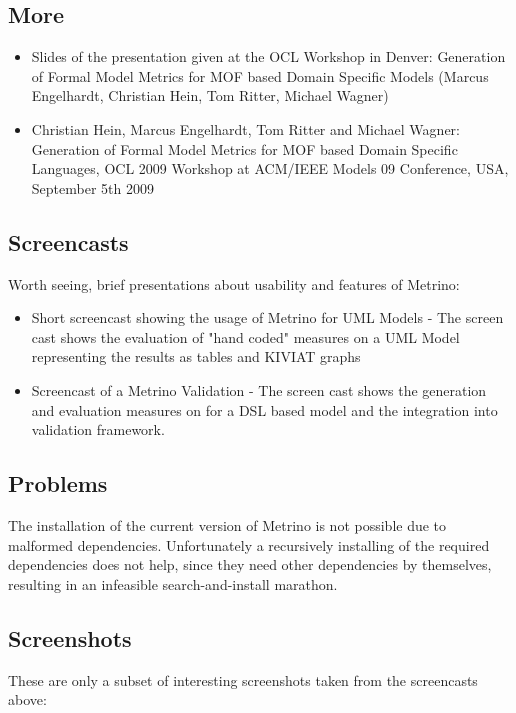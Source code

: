 \subsection{More}
\begin{itemize}
\item Slides of the presentation given at the OCL Workshop in Denver: Generation of Formal Model Metrics for MOF based Domain Specific Models (Marcus Engelhardt, Christian Hein, Tom Ritter, Michael Wagner)
\item Christian Hein, Marcus Engelhardt, Tom Ritter and Michael Wagner: Generation of Formal Model Metrics for MOF based Domain Specific Languages, OCL 2009 Workshop at ACM/IEEE Models 09 Conference, USA, September 5th 2009
\end{itemize}

\subsection{Screencasts}
Worth seeing, brief presentations about usability and features of Metrino:

\begin{itemize}
\item Short screencast showing the usage of Metrino for UML Models - The screen cast shows the evaluation of "hand coded" measures on a UML Model representing the results as tables and KIVIAT graphs
\item Screencast of a Metrino Validation - The screen cast shows the generation and evaluation measures on for a DSL based model and the integration into validation framework.
\end{itemize}

\subsection{Problems}
The installation of the current version of Metrino is not possible due to malformed dependencies. Unfortunately a recursively installing of the required dependencies does not help, since they need other dependencies by themselves, resulting in an infeasible search-and-install marathon.


\subsection{Screenshots}
These are only a subset of interesting screenshots taken from the screencasts above:

